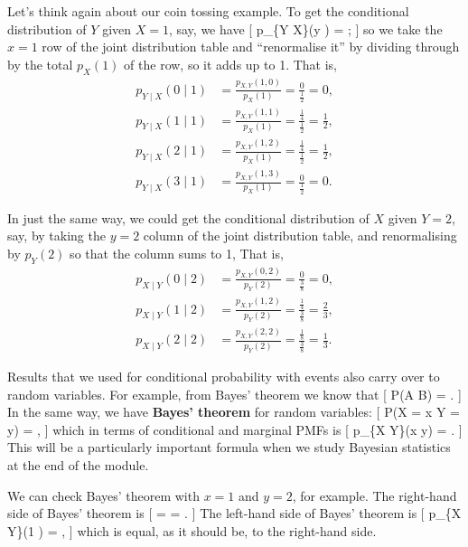 \documentclass[
  letterpaper,
]{report}
\theoremstyle{definition}
\theoremstyle{definition}
\theoremstyle{remark}
\begin{document}
Let's think again about our coin tossing example. To get the conditional
distribution of \(Y\) given \(X = 1\), say, we have {[} p\_\{Y
\mid X\}(y ) =  ; {]} so we take the
\(x = 1\) row of the joint distribution table and ``renormalise it'' by
dividing through by the total \(p_X(1)\) of the row, so it adds up to 1.
That is, \begin{align*}
  p_{Y \mid X} (0 \mid 1) &= \frac{p_{X,Y}(1, 0)}{p_X(1)} = \frac{0}{\frac12} = 0 , \\
  p_{Y \mid X} (1 \mid 1) &= \frac{p_{X,Y}(1, 1)}{p_X(1)} = \frac{\frac14}{\frac12} = \tfrac12 , \\
  p_{Y \mid X} (2 \mid 1) &= \frac{p_{X,Y}(1, 2)}{p_X(1)} = \frac{\frac14}{\frac12} = \tfrac12 , \\
  p_{Y \mid X} (3 \mid 1) &= \frac{p_{X,Y}(1, 3)}{p_X(1)} = \frac{0}{\frac12} = 0 .
\end{align*}

In just the same way, we could get the conditional distribution of \(X\)
given \(Y = 2\), say, by taking the \(y = 2\) column of the joint
distribution table, and renormalising by \(p_Y(2)\) so that the column
sums to 1, That is, \begin{align*}
  p_{X \mid Y} (0 \mid 2) &= \frac{p_{X,Y}(0,2)}{p_Y(2)} = \frac{0}{\frac38} = 0 , \\
  p_{X \mid Y} (1 \mid 2) &= \frac{p_{X,Y}(1,2)}{p_Y(2)} = \frac{\frac14}{\frac38} = \tfrac23 , \\
  p_{X \mid Y} (2 \mid 2) &= \frac{p_{X,Y}(2,2)}{p_Y(2)} = \frac{\frac18}{\frac38} = \tfrac13 .
\end{align*}

Results that we used for conditional probability with events also carry
over to random variables. For example, from Bayes' theorem we know that
{[} \mathbb P(A \mid B) =
 . {]} In the
same way, we have \textbf{Bayes' theorem} for random variables: {[}
\mathbb P(X = x \mid Y = y) =
, {]} which in terms of conditional and marginal PMFs is {[} p\_\{X
\mid Y\}(x \mid y) =  .
{]} This will be a particularly important formula when we study Bayesian
statistics at the end of the module.

We can check Bayes' theorem with \(x = 1\) and \(y = 2\), for example.
The right-hand side of Bayes' theorem is {[}
 =
 =  . {]} The
left-hand side of Bayes' theorem is {[} p\_\{X \mid Y\}(1 ) =
 , {]} which is equal, as it should be, to the right-hand side.
\end{document}

